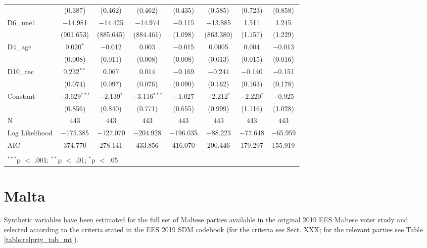 \documentclass[
]{article}
\begin{document}
\begin{table}[!htbp]
\begin{tabular}{@{\extracolsep{5pt}}lccccccc}
  & (0.387) & (0.462) & (0.462) & (0.435) & (0.585) & (0.723) & (0.858) \\ 
  D6\_une1 & $-$14.981 & $-$14.425 & $-$14.974 & $-$0.115 & $-$13.885 & 1.511 & 1.245 \\ 
  & (901.653) & (885.645) & (884.461) & (1.098) & (863.380) & (1.157) & (1.229) \\ 
  D4\_age & 0.020$^{*}$ & $-$0.012 & 0.003 & $-$0.015 & 0.0005 & 0.004 & $-$0.013 \\ 
  & (0.008) & (0.011) & (0.008) & (0.008) & (0.013) & (0.015) & (0.016) \\ 
  D10\_rec & 0.232$^{**}$ & 0.067 & 0.014 & $-$0.169 & $-$0.244 & $-$0.140 & $-$0.151 \\ 
  & (0.074) & (0.097) & (0.076) & (0.090) & (0.162) & (0.163) & (0.178) \\ 
  Constant & $-$3.629$^{***}$ & $-$2.139$^{*}$ & $-$3.116$^{***}$ & $-$1.027 & $-$2.212$^{*}$ & $-$2.220$^{*}$ & $-$0.925 \\ 
  & (0.856) & (0.840) & (0.771) & (0.655) & (0.999) & (1.116) & (1.028) \\ 
 N & 443 & 443 & 443 & 443 & 443 & 443 & 443 \\ 
Log Likelihood & $-$175.385 & $-$127.070 & $-$204.928 & $-$196.035 & $-$88.223 & $-$77.648 & $-$65.959 \\ 
AIC & 374.770 & 278.141 & 433.856 & 416.070 & 200.446 & 179.297 & 155.919 \\ 
\hline \\[-1.8ex] 
\multicolumn{8}{l}{$^{***}$p $<$ .001; $^{**}$p $<$ .01; $^{*}$p $<$ .05} \\ 
\end{tabular} 
\end{table}

\clearpage

\newpage

\hypertarget{malta}{%
\section{Malta}\label{malta}}

Synthetic variables have been estimated for the full set of Maltese parties available in the original
2019 EES Maltese voter study and selected according to the criteria stated in the EES 2019 SDM codebook (for the criteria see Sect. XXX; for the relevant parties see Table \ref{table:relprty_tab_mt}).
\end{document}
